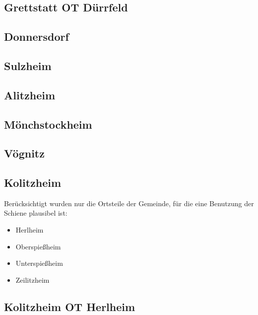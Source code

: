 \documentclass[fontsize=12pt,a4paper]{scrreprt}
\begin{document}
        \subsection{Grettstatt OT Dürrfeld}
        

        \subsection{Donnersdorf}
        

        \subsection{Sulzheim}
        

        \subsection{Alitzheim}
        

        \subsection{Mönchstockheim}
        

        \subsection{Vögnitz}
        

        \subsection{Kolitzheim}
        Berücksichtigt wurden nur die Ortsteile der Gemeinde, für die eine Benutzung der Schiene plausibel ist:

        \vspace{1em}

        \begin{itemize}[nosep]
                \item Herlheim
                \item Oberspießheim
                \item Unterspießheim
                \item Zeilitzheim
        \end{itemize}

        \subsection{Kolitzheim OT Herlheim}
        
\end{document}

